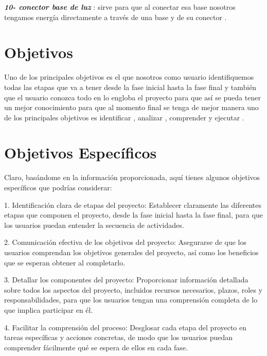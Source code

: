     \textbf{\textit{10- conector base de luz  }}: sirve para que al conectar esa base nosotros tengamos energía directamente a  través  de una base y de su conector . 
    \newline
    
    \section { Objetivos }
    
    Uno de los principales objetivos es el que nosotros como usuario identifiquemos todas las etapas que va a tener desde la fase inicial hasta la fase final y también que el usuario conozca todo en lo engloba el proyecto para que así se pueda tener un mejor conocimiento para que al momento final se tenga de mejor manera uno de los principales objetivos es identificar , analizar , comprender y ejecutar .
    
    \section{Objetivos Específicos }
    
    Claro, basándome en la información proporcionada, aquí tienes algunos objetivos específicos que podrías considerar:
    
    1. Identificación clara de etapas del proyecto: Establecer claramente las diferentes etapas que componen el proyecto, desde la fase inicial hasta la fase final, para que los usuarios puedan entender la secuencia de actividades. 
    \newline
    
    2. Comunicación efectiva de los objetivos del proyecto: Asegurarse de que los usuarios comprendan los objetivos generales del proyecto, así como los beneficios que se esperan obtener al completarlo.
    \newline
    
    3. Detallar los componentes del proyecto: Proporcionar información detallada sobre todos los aspectos del proyecto, incluidos recursos necesarios, plazos, roles y responsabilidades, para que los usuarios tengan una comprensión completa de lo que implica participar en él. \newline
    
    4. Facilitar la comprensión del proceso: Desglosar cada etapa del proyecto en tareas específicas y acciones concretas, de modo que los usuarios puedan comprender fácilmente qué se espera de ellos en cada fase. 
    \newline
    
